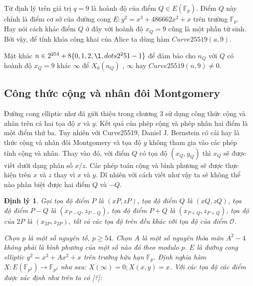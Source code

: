 \documentclass[a4paper,12pt]{report}
\newtheorem{theorem}{Định lý}[chapter]
\begin{document}
Từ định lý trên giá trị $q = 9$ là hoành độ của điểm $Q \in E(\mathbb{F}_p)$. Điểm $Q$ này chính là điểm cơ sở của đường cong $E : y^2 = x^3 + 486662x^2 + x$ trên trường $\mathbb{F}_p$. Hay nói cách khác điểm $Q$ ở đây với hoành độ $x_Q = 9$ cũng là một phần tử sinh. Bởi vậy, để tính khóa công khai của Alice ta dùng hàm $Curve25519(a, 9)$.

Mặt khác $n \in 2^{254} + 8\{0, 1, 2, \l,dots 2^251 - 1\}$ để đảm bảo cho $n_Q$ với $Q$ có hoành độ $x_Q = 9$ khác $\infty$ để $X_0(n_Q)$ , $\infty$ hay $Curve25519(n, 9) \neq 0$.

\subsection*{Công thức cộng và nhân đôi Montgomery}
Đường cong elliptic như đã giới thiệu trong chương 3 sử dụng công thức cộng và nhân trên cả hai tọa độ $x$ và $y$. Kết quả của phép cộng và phép nhân hai điểm là một điểm thứ ba. Tuy nhiên với Curve25519, Daniel J. Bernstein có cái hay là thức cộng và nhân đôi Montgomery và tọa độ $y$ không tham gia vào các phép tính cộng và nhân. Thay vào đó, với điểm $Q$ có tọa độ
$(x_Q, y_Q)$ thì $x_Q$ sẽ được viết dưới dạng phân số $x/z$. Các phép toán cộng và bình phương sẽ được thực hiện trên $x$ và $z$ thay vì $x$ và $y$. Dĩ nhiên với cách viết như vậy ta sẽ không thể nào phân biệt được hai điểm $Q$ và $-Q$.
\begin{theorem}
Gọi tọa độ điểm $P$ là $(xP, zP)$, tọa độ điểm $Q$ là $(xQ, zQ)$, tọa độ điểm $P - Q$ là $(x_{P-Q}, z_{P-Q})$, tọa độ điểm $P + Q$ là $(x_{P+Q}, z_{P+Q})$, tọa độ của $2P$ là $(x_{2P}, z_{2P})$, tất cả các tọa độ trên đều khác với tọa độ của điểm $\mathcal{O}$.

Chọn $p$ là một số nguyên tố, $p \geq 54$. Chọn $A$ là một số nguyên thõa mãn $A^2 - 4$ không phải là bình phương của một số nào đó theo modulo $p$. $E$ là đường cong elliptic $y^2 = x^3 + Ax^2 + x$ trên trường hữu hạn $\mathbb{F}_p$. Định nghĩa hàm $X : E(\mathbb{F}_{p^2}) \rightarrow \mathbb{F}_{p^2}$ như sau: $X(\infty) = 0; X(x, y) = x$. Với các tọa độ các điểm được xác định như trên ta có [?]:
\end{theorem} 
\end{document}
